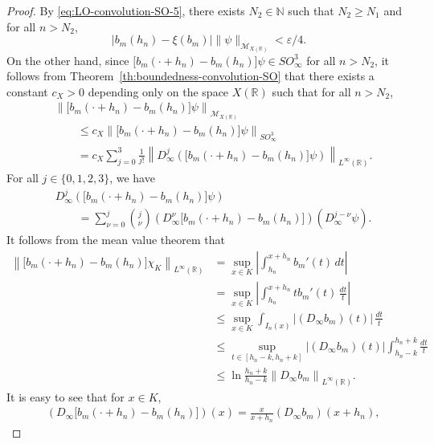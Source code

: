 \documentclass{birkjour}
\numberwithin{equation}{section}
\newcommand{\N}{\mathbb{N}}
\newcommand{\R}{\mathbb{R}}
\newcommand{\cM}{\mathcal{M}}
\newcommand{\eps}{\varepsilon}
\begin{document}
\begin{proof}
By \eqref{eq:LO-convolution-SO-5}, there exists $N_2\in\N$ such that
$N_2\ge N_1$ and for all $n>N_2$,
\begin{equation}\label{eq:LO-convolution-SO-10}
\big|b_m(h_n)-\xi(b_m)\big|\|\psi\|_{\cM_{X(\R)}}<\eps/4.
\end{equation}
On the other hand, since
$\big[b_m(\cdot+h_n)-b_m(h_n)\big]\psi\in SO_\infty^3$
for all $n>N_2$, it follows from Theorem~\ref{th:boundedness-convolution-SO}
that there exists a constant $c_X>0$ depending only on the space $X(\R)$
such that for all $n>N_2$,
\begin{align}
&\left\|\big[b_m(\cdot+h_n)-b_m(h_n)\big]\psi
\right\|_{\cM_{X(\R)}}
\nonumber
\\
&\quad\quad\le c_X
\left\|
\big[b_m(\cdot+h_n)-b_m(h_n)\big]\psi
\right\|_{SO_\infty^3}
\nonumber
\\
&\quad\quad
=c_X
\sum_{j=0}^3\frac{1}{j!}
\left\|
D_\infty^j\left(
\big[b_m(\cdot+h_n)-b_m(h_n)\big]\psi
\right)
\right\|_{L^\infty(\R)}.
\label{eq:LO-convolution-SO-11}
\end{align}
For all $j\in\{0,1,2,3\}$, we have
\begin{align}
&
D_\infty^j\left(
\big[b_m(\cdot+h_n)-b_m(h_n)\big]\psi
\right)
\nonumber
\\
&\quad\quad
=\sum_{\nu=0}^j \binom{j}{\nu}
\left(D_\infty^\nu
\big[b_m(\cdot+h_n)-b_m(h_n)\big]
\right)
\left(D_\infty^{j-\nu}\psi\right)\!.
\label{eq:LO-convolution-SO-12}
\end{align}
It follows from the mean value theorem that
\begin{align}
\left\|
\big[b_m(\cdot+h_n)-b_m(h_n)\big]\chi_K
\right\|_{L^\infty(\R)}
&
=
\sup_{x\in K}\left|\int_{h_n}^{x+h_n}b_m'(t)\,dt\right|
\nonumber
\\
&
=
\sup_{x\in K}\left|
\int_{h_n}^{x+h_n}tb_m'(t)\,\frac{dt}{t}
\right|
\nonumber
\\
&
\le
\sup_{x\in K}\int_{I_n(x)}
\big|(D_\infty b_m)(t)\big|\,\frac{dt}{t}
\nonumber
\\
&
\le
\sup_{t\in[h_n-k,h_n+k]}\big|(D_\infty b_m)(t)\big|
\int_{h_n-k}^{h_n+k}\frac{dt}{t}
\nonumber
\\
&
\le
\ln\frac{h_n+k}{h_n-k}
\left\|D_\infty b_m\right\|_{L^\infty(\R)}.
\label{eq:LO-convolution-SO-13}
\end{align}
It is easy to see that for $x\in K$,
\begin{align}
&
\left(
D_\infty\big[b_m(\cdot+h_n)-b_m(h_n)\big]
\right)(x)
=
\frac{x}{x+h_n}
(D_\infty b_m)(x+h_n),

\end{align}
\end{proof}
\end{document}
